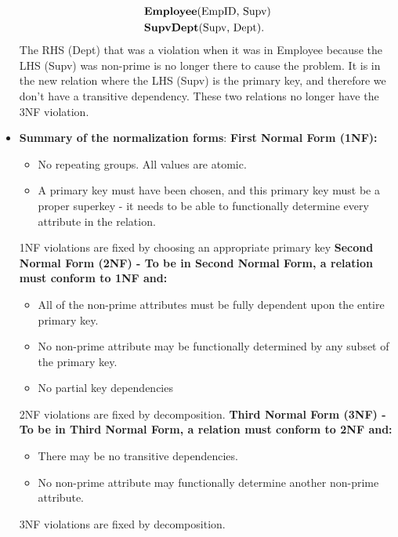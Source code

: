 \documentclass{report}
\begin{document}
\begin{itemize}
\begin{align*}
                &\text{\textbf{Employee}(EmpID, Supv)} \\
                &\text{\textbf{SupvDept}(Supv, Dept)}
            .\end{align*}
            \bigbreak \noindent 
            The RHS (Dept) that was a violation when it was in Employee because the LHS (Supv) was non-prime is no longer
            there to cause the problem. It is in the new relation where the LHS (Supv) is the primary key, and therefore we
            don't have a transitive dependency. These two relations no longer have the 3NF violation.
        \item \textbf{Summary of the normalization forms}:
            \bigbreak \noindent 
            \textbf{First Normal Form (1NF):}
            \begin{itemize}
                \item No repeating groups. All values are atomic.
                \item A primary key must have been chosen, and this primary key must be a proper superkey - it needs to be able to functionally determine every attribute in the relation.
            \end{itemize}
            1NF violations are fixed by choosing an appropriate primary key
            \bigbreak \noindent 
            \textbf{Second Normal Form (2NF) - To be in Second Normal Form, a relation must conform to 1NF and:}
            \begin{itemize}
                \item All of the non-prime attributes must be fully dependent upon the entire primary key.
                \item No non-prime attribute may be functionally determined by any subset of the primary key.
                \item No partial key dependencies
            \end{itemize}
            \bigbreak \noindent 
            2NF violations are fixed by decomposition.
            \bigbreak \noindent 
            \textbf{Third Normal Form (3NF) - To be in Third Normal Form, a relation must conform to 2NF and:}
            \begin{itemize}
                \item There may be no transitive dependencies.
                \item No non-prime attribute may functionally determine another non-prime attribute.
            \end{itemize}
            \bigbreak \noindent 
            3NF violations are fixed by decomposition.




    \end{itemize}
\end{document}
